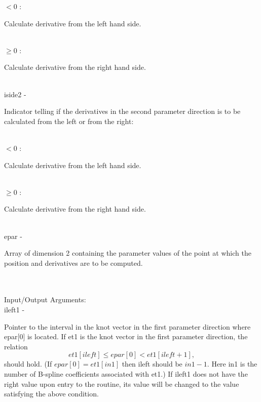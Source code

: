                       \>\>\>\> $<0$ \> :
                      \begin{minipg5}
                        Calculate derivative from the left hand side.
                      \end{minipg5}\\[0.8ex]
                      \>\>\>\> $\geq 0$ \> :
                      \begin{minipg5}
                        Calculate derivative from the right hand side.
                      \end{minipg5}\\[0.8ex]
        \>\> {\fov iside2}\> - \>
        \begin{minipg2}
          Indicator telling if the derivatives in the second
          parameter direction is to be calculated from the
          left or from the right:
        \end{minipg2}\\[0.3ex]
                      \>\>\>\> $<0$ \> :
                      \begin{minipg5}
                        Calculate derivative from the left hand side.
                      \end{minipg5}\\[0.8ex]
                      \>\>\>\> $\geq 0$ \> :
                      \begin{minipg5}
                        Calculate derivative from the right hand side.
                      \end{minipg5}\\[0.8ex]
        \>\>    {\fov epar}\> - \>
        \begin{minipg2}
          Array of dimension 2 containing the
          parameter values of the point at which the position
          and derivatives are to be computed.
        \end{minipg2}\\[0.8ex]
\\
        \>Input/Output Arguments:\\
        \>\>    {\fov ileft1}\> - \>
        \begin{minipg2}
          Pointer to the interval in the knot vector
          in the first parameter direction where {\fov epar}[0]
          is located. If {\fov et1} is the knot vector in the first
          parameter direction, the relation
          \[
          et1[ileft]\leq epar[0] < et1[ileft+1],
          \]
          should hold. (If $epar[0]=et1[in1]$ then {\fov ileft} should
          be $in1-1$. Here {\fov in1} is the number of B-spline
          coefficients associated with {\fov et1}.)
          If {\fov ileft1} does not have the right value upon
          entry to the routine, its value will be changed
          to the value satisfying the above condition.
        \end{minipg2}\\[0.8ex]
